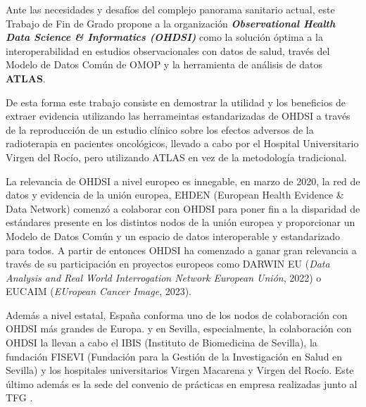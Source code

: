 Ante las necesidades y desafíos del complejo panorama sanitario actual, este Trabajo de Fin de Grado propone a la organización \textbf{\textit{Observational Health Data Science \& Informatics (OHDSI)}} como la solución óptima a la interoperabilidad en estudios observacionales con datos de salud, través del Modelo de Datos Común de OMOP y la herramienta de análisis de datos \textbf{ATLAS}. 

De esta forma este trabajo consiste en demostrar la utilidad y los beneficios de extraer evidencia utilizando las herrameintas estandarizadas de OHDSI a través de la reproducción de un estudio clínico sobre los efectos adversos de la radioterapia en pacientes oncológicos, llevado a cabo por el Hospital Universitario Virgen del Rocío, pero utilizando ATLAS en vez de la metodología tradicional.

La relevancia de OHDSI a nivel europeo es innegable, en marzo de 2020, la red de datos y evidencia de la unión europea, EHDEN (European Health Evidence \& Data Network) comenzó a colaborar con OHDSI para poner fin a la disparidad de estándares presente en los distintos nodos de la unión europea y proporcionar un Modelo de Datos Común y un espacio de datos interoperable y estandarizado para todos. A partir de entonces OHDSI ha comenzado a ganar gran relevancia a través de su participación en proyectos europeos como DARWIN EU (\textit{Data Analysis and Real World Interrogation Network European Unión}, 2022) \cite{OHDSI2023Darwin} %
o EUCAIM (\textit{EUropean Cancer Image}, 2023).%

Además a nivel estatal, España conforma uno de los nodos de colaboración con OHDSI más grandes de Europa. %
y en Sevilla, especialmente, la colaboración con OHDSI la llevan a cabo el IBIS (Instituto de Biomedicina de Sevilla), la fundación FISEVI (Fundación para la Gestión de la Investigación en Salud en Sevilla) y los hospitales universitarios Virgen Macarena y Virgen del Rocío. Este último además es la sede del convenio de prácticas en empresa realizadas junto al TFG . %


